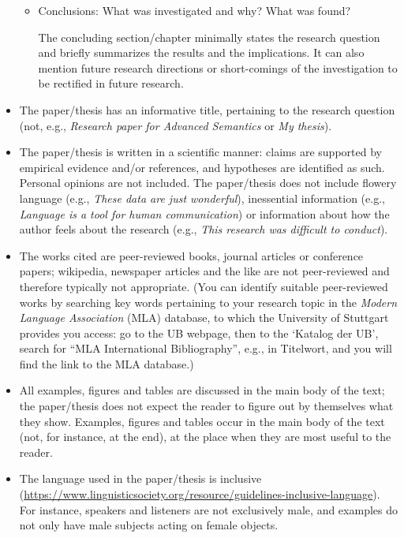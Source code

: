 \documentclass[11pt,fleqn,a4paper/thesis]{article}
\newcommand{\6}{\mbox{$[\hspace*{-.6mm}[$}}
\newcommand{\9}{\mbox{$]\hspace*{-.6mm}]$}}
\begin{document}
\begin{itemize}[itemsep=-1pt,leftmargin=2.5ex,topsep=-2pt]
\begin{itemize}[leftmargin=2.5ex,topsep=-2pt]
\item Conclusions: What was investigated and why? What was found?

The concluding section/chapter minimally states the research question and briefly summarizes the results and the implications. It can also mention future research directions or short-comings of the investigation to be rectified in future research. 

\end{itemize}

\item The paper/thesis has an informative title, pertaining to the research question (not, e.g., {\em Research paper for Advanced Semantics} or {\em My thesis}).

\item The paper/thesis is written in a scientific manner: claims are supported by empirical evidence and/or references, and hypotheses are identified as such. Personal opinions are not included. The paper/thesis does not include flowery language (e.g., {\em These data are just wonderful}), inessential information (e.g., {\em Language is a tool for human communication}) or information about how the author feels about the research (e.g., {\em This research was difficult to conduct}).

\item The works cited are peer-reviewed books, journal articles or conference papers; wikipedia, newspaper articles and the like are not peer-reviewed and therefore typically not appropriate. (You can identify suitable peer-reviewed works by searching key words pertaining to your research topic in the {\em Modern Language Association} (MLA) database, to which the University of Stuttgart provides you access: go to the UB webpage, then to the `Katalog  der UB', search for ``MLA International Bibliography'', e.g., in Titelwort, and you will find the link to the MLA database.)

\item All examples, figures and tables are discussed in the main body of the text; the paper/thesis does not expect the reader to figure out by themselves what they show. Examples, figures and tables occur in the main body of the text (not, for instance, at the end), at the place when they are most useful to the reader.

\item The language used in the paper/thesis is inclusive (\url{https://www.linguisticsociety.org/resource/guidelines-inclusive-language}). For instance, speakers and listeners are not exclusively male, and examples do not only have male subjects acting on female objects.

\end{itemize}
\end{document}
